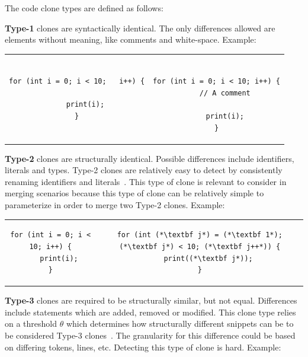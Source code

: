 The code clone types are defined as follows:

\textbf{Type-1} clones are syntactically identical. The only differences allowed are elements
without meaning, like comments and white-space. Example:

\begin{tcolorbox}
	\begin{center}
		\begin{tabular}{c | c}
            \begin{lstlisting}
for (int i = 0; i < 10;   i++) {

    print(i);
}
        \end{lstlisting} &
			\begin{lstlisting}

for (int i = 0; i < 10; i++) {
    // A comment

    print(i);
}
        \end{lstlisting}
		\end{tabular}
	\end{center}
\end{tcolorbox}


\textbf{Type-2} clones are structurally identical. Possible differences include
identifiers, literals and types. Type-2 clones are relatively easy to detect by
consistently renaming identifiers and literals~\cite[2]{Zibran_real_time_search}. This
type of clone is relevant to consider in merging scenarios because this type of clone can
be relatively simple to parameterize in order to merge two Type-2 clones. Example:

\begin{center}
	\begin{tcolorbox}
		\begin{tabular}{c | c}
			\begin{lstlisting}
for (int i = 0; i < 10; i++) {
    print(i);
}
    \end{lstlisting} &
	\begin{lstlisting}
for (int (*\textbf j*) = (*\textbf 1*); (*\textbf j*) < 10; (*\textbf j++*)) {
    print((*\textbf j*));
}
    \end{lstlisting}
		\end{tabular}
	\end{tcolorbox}
\end{center}

\textbf{Type-3} clones are required to be structurally similar, but not equal. Differences
include statements which are added, removed or modified. This clone type relies on a
threshold $\theta$ which determines how structurally different snippets can be to be
considered Type-3 clones~\cite{Inoue_introduction_to_cc}. The granularity for this
difference could be based on differing tokens, lines, etc. Detecting this type of clone is
hard. Example:

